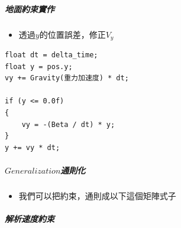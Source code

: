 \subparagraph{地面約束實作}

\begin{itemize}
    \item{透過$y$的位置誤差，修正$V_y$}
\end{itemize}

\begin{lstlisting}
float dt = delta_time;
float y = pos.y;
vy += Gravity(重力加速度) * dt;

if (y <= 0.0f)
{
    vy = -(Beta / dt) * y;
}
y += vy * dt;
\end{lstlisting}


\subparagraph{\(Generalization\)通則化}

\begin{itemize}
    \item{我們可以把約束，通則成以下這個矩陣式子}
\end{itemize}

\subparagraph{解析速度約束}

